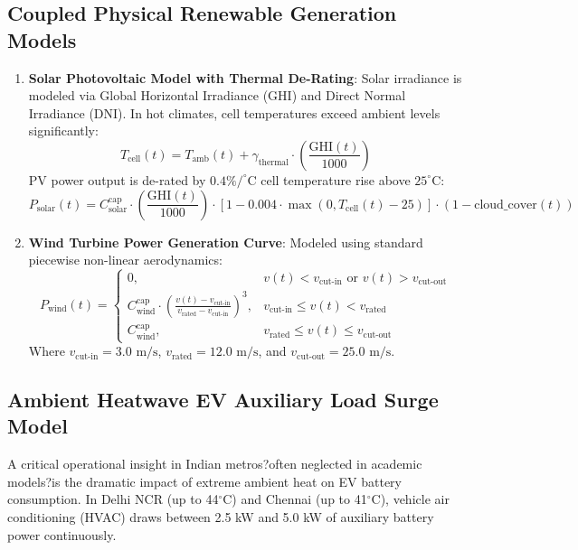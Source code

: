 \documentclass[10.5pt,a4paper]{article}
\begin{document}
\subsection{Coupled Physical Renewable Generation Models}
\begin{enumerate}
    \item \textbf{Solar Photovoltaic Model with Thermal De-Rating}: Solar irradiance is modeled via Global Horizontal Irradiance (GHI) and Direct Normal Irradiance (DNI). In hot climates, cell temperatures exceed ambient levels significantly:
    \begin{equation}
        T_{\text{cell}}(t) = T_{\text{amb}}(t) + \gamma_{\text{thermal}} \cdot \left( \frac{\text{GHI}(t)}{1000} \right)
    \end{equation}
    PV power output is de-rated by $0.4\% / ^\circ\text{C}$ cell temperature rise above $25^\circ\text{C}$:
    \begin{equation}
        P_{\text{solar}}(t) = C_{\text{solar}}^{\text{cap}} \cdot \left( \frac{\text{GHI}(t)}{1000} \right) \cdot \left[ 1 - 0.004 \cdot \max(0, T_{\text{cell}}(t) - 25) \right] \cdot (1 - \text{cloud\_cover}(t))
    \end{equation}
    \item \textbf{Wind Turbine Power Generation Curve}: Modeled using standard piecewise non-linear aerodynamics:
    \begin{equation}
        P_{\text{wind}}(t) = \begin{cases}
            0, & v(t) < v_{\text{cut-in}} \text{ or } v(t) > v_{\text{cut-out}} \\
            C_{\text{wind}}^{\text{cap}} \cdot \left( \frac{v(t) - v_{\text{cut-in}}}{v_{\text{rated}} - v_{\text{cut-in}}} \right)^3, & v_{\text{cut-in}} \le v(t) < v_{\text{rated}} \\
            C_{\text{wind}}^{\text{cap}}, & v_{\text{rated}} \le v(t) \le v_{\text{cut-out}}
        \end{cases}
    \end{equation}
    Where $v_{\text{cut-in}} = 3.0\text{ m/s}$, $v_{\text{rated}} = 12.0\text{ m/s}$, and $v_{\text{cut-out}} = 25.0\text{ m/s}$.
\end{enumerate}

\subsection{Ambient Heatwave EV Auxiliary Load Surge Model}
A critical operational insight in Indian metros?often neglected in academic models?is the dramatic impact of extreme ambient heat on EV battery consumption. In Delhi NCR (up to 44$^\circ$C) and Chennai (up to 41$^\circ$C), vehicle air conditioning (HVAC) draws between 2.5 kW and 5.0 kW of auxiliary battery power continuously.
\end{document}
